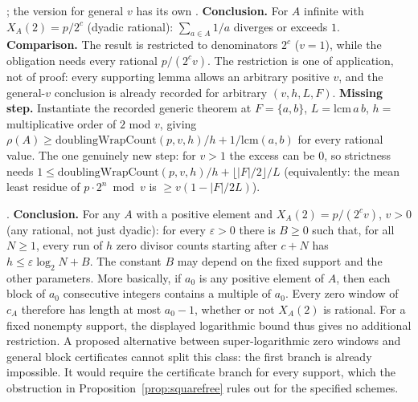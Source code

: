 \begin{obs}
;
the version for general $v$ has its own
.
\textbf{Conclusion.} For $A$ infinite with $X_{A}(2) = p/2^c$ (dyadic
rational): $\sum_{a\in A}1/a$ diverges or exceeds $1$.
\textbf{Comparison.} The result is restricted to denominators $2^c$ ($v{=}1$), while
the obligation needs every rational $p/(2^c v)$.  The restriction is one of application, not
of proof: every supporting lemma allows an arbitrary positive $v$, and the general-$v$
conclusion is already recorded for arbitrary $(v,h,L,F)$.
\textbf{Missing step.} Instantiate the recorded generic theorem at $F=\{a,b\}$, $L=\mathrm{lcm}\,a\,b$,
$h=$ multiplicative order of $2$ mod $v$, giving $\rho(A) \ge
\mathrm{doublingWrapCount}(p,v,h)/h + 1/\mathrm{lcm}(a,b)$ for every rational value. The one
genuinely new step: for $v{>}1$ the excess can be $0$, so strictness needs $1 \le
\mathrm{doublingWrapCount}(p,v,h)/h + \lfloor|F|/2\rfloor/L$ (equivalently: the
mean least residue of $p\cdot2^n \bmod v$ is $\ge v(1-|F|/2L)$).
\end{obs}

\begin{obs}
.
\textbf{Conclusion.} For any $A$ with a positive element and
$X_{A}(2)=p/(2^c v)$, $v{>}0$ (any rational, not just dyadic):
for every $\varepsilon>0$ there is $B\ge0$ such that, for all $N\ge1$, every run of $h$ zero
divisor counts starting after $c+N$ has $h \le \varepsilon\log_2 N + B$. The constant $B$ may depend on the fixed support and the other parameters.
More basically, if $a_0$ is any positive element of $A$, then each block
of $a_0$ consecutive integers contains a multiple of $a_0$.  Every zero
window of $c_A$ therefore has length at most $a_0-1$, whether or not
$X_A(2)$ is rational.  For a fixed nonempty support, the displayed
logarithmic bound thus gives no additional restriction.
A proposed alternative between super-logarithmic zero windows and general
block certificates cannot split this class: the first branch is already
impossible.  It would require the certificate branch for every support,
which the obstruction in Proposition~\ref{prop:squarefree} rules out for
the specified schemes.
\end{obs}

